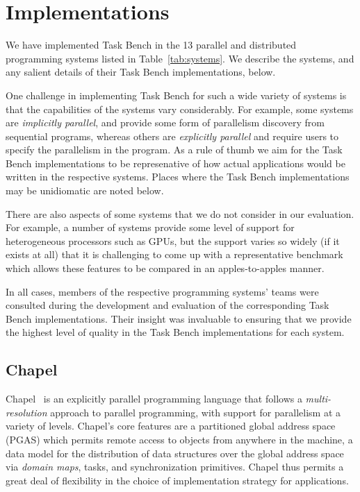 \section{Implementations}
\label{sec:implementation}



We have implemented Task Bench in the 13 parallel and distributed
programming systems listed in Table~\ref{tab:systems}. We describe the
systems, and any salient details of their Task Bench implementations,
below.

One challenge in implementing Task Bench for such a wide variety of
systems is that the capabilities of the systems vary considerably. For
example, some systems are \emph{implicitly parallel}, and provide some
form of parallelism discovery from sequential programs, whereas others
are \emph{explicitly parallel} and require users to specify the
parallelism in the program. As a rule of thumb we aim for the Task
Bench implementations to be represenative of how actual applications
would be written in the respective systems. Places where the Task
Bench implementations may be unidiomatic are noted below.

There are also aspects of some systems that we do not consider in our
evaluation. For example, a number of systems provide some level of
support for heterogeneous processors such as GPUs, but the support
varies so widely (if it exists at all) that it is challenging to come
up with a representative benchmark which allows these features to be
compared in an apples-to-apples manner.

In all cases, members of the respective programming systems' teams
were consulted during the development and evaluation of the
corresponding Task Bench implementations. Their insight was invaluable
to ensuring that we provide the highest level of quality in the Task
Bench implementations for each system.

\subsection{Chapel}

Chapel~\cite{Chapel07} is an explicitly parallel programming language
that follows a \emph{multi-resolution} approach to parallel
programming, with support for parallelism at a variety of
levels. Chapel's core features are a partitioned global address space
(PGAS) which permits remote access to objects from anywhere in the
machine, a data model for the distribution of data structures over the
global address space via \emph{domain maps}, tasks, and
synchronization primitives. Chapel thus permits a great deal of
flexibility in the choice of implementation strategy for applications.

